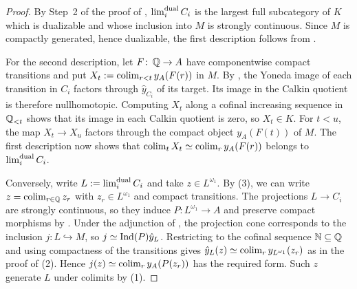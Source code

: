 	\begin{proof}
		By Step~2 of the proof of , $\operatorname{lim}^{\operatorname{dual}}_i C_i$ is the largest full subcategory of $K$ which is dualizable and whose inclusion into $M$ is strongly continuous. Since $M$ is compactly generated, hence dualizable, the first description follows from .

		For the second description, let $F\colon\operatorname{\mathbb Q}\to A$ have componentwise compact transitions and put $X_t:=\operatorname{colim}_{r<t}y_A(F(r))$ in $M$. By , the Yoneda image of each transition in $C_i$ factors through $\hat y_{C_i}$ of its target. Its image in the Calkin quotient is therefore nullhomotopic. Computing $X_t$ along a cofinal increasing sequence in $\operatorname{\mathbb Q}_{<t}$ shows that its image in each Calkin quotient is zero, so $X_t\in K$. For $t<u$, the map $X_t\to X_u$ factors through the compact object $y_A(F(t))$ of $M$. The first description now shows that $\operatorname{colim}_t X_t\simeq\operatorname{colim}_r y_A(F(r))$ belongs to $\operatorname{lim}_i^{\operatorname{dual}} C_i$.

		Conversely, write $L:=\operatorname{lim}_i^{\operatorname{dual}} C_i$ and take $z\in L^{\omega_1}$. By (3), we can write $z=\operatorname{colim}_{r\in\operatorname{\mathbb Q}}z_r$ with $z_r\in L^{\omega_1}$ and compact transitions. The projections $L\to C_i$ are strongly continuous, so they induce $P\colon L^{\omega_1}\to A$ and preserve compact morphisms by . Under the adjunction of , the projection cone corresponds to the inclusion $j\colon L\hookrightarrow M$, so $j\simeq\operatorname{Ind}(P)\hat y_L$. Restricting to the cofinal sequence $\operatorname{\mathbb N}\subseteq\operatorname{\mathbb Q}$ and using compactness of the transitions gives $\hat y_L(z)\simeq\operatorname{colim}_r y_{L^{\omega_1}}(z_r)$ as in the proof of (2). Hence $j(z)\simeq\operatorname{colim}_r y_A(P(z_r))$ has the required form. Such $z$ generate $L$ under colimits by (1).
	\end{proof}


